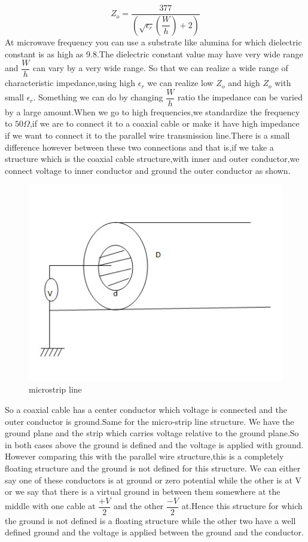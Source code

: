 \begin{equation*}
Z_o=\dfrac{377}{(\sqrt{\epsilon_r}( \dfrac{W}{h})+2)}
\end{equation*}
At microwave frequency you can use a substrate like alumina for which dielectric constant is as high as 9.8.The dielectric constant value may have very wide range and $\dfrac{W}{h}$ can vary by a very wide range. So that we can realize a wide range of characteristic impedance,using high $\epsilon_r$ we can realize low $Z_o$ and high $Z_o$ with small $\epsilon_r$.
Something we can do by changing $\dfrac{W}{h}$ ratio the impedance can be varied by a large amount.When we go to high frequencies,we standardize the frequency to  $50\Omega$,if we are to connect it to a coaxial cable or make it have high impedance if we want to connect it to the parallel wire transmission line.There is a small difference however between these two connections and that is,if we take a structure which is the coaxial cable structure,with inner and outer conductor,we connect voltage to inner conductor and ground the outer conductor as shown.\\
\begin{figure}[h]
\centering
\includegraphics[width=1\linewidth]{./graphics/ground}
\caption{microstrip line}
\end{figure}
So a coaxial cable has a center conductor which voltage is connected and the outer conductor is ground.Same for the micro-strip line structure. 
We have the ground plane and the strip which carries voltage relative to the ground plane.So in both cases above the ground is defined and the voltage is applied with ground. However comparing this with the parallel wire structure,this is a completely floating structure and the ground is not defined for this structure. We can either say one of these conductors is at ground or zero potential while the other is at V or we say that  there is a virtual ground in between them somewhere at the middle with one cable at $\dfrac{+V}{2}$ and the other $\dfrac{-V}{2}$ at.Hence this structure for which the ground is not defined is a floating structure while the other two have a well defined ground and the voltage is applied between the ground and the conductor.

